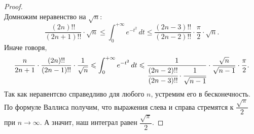 \begin{proof}
\[	\]
	Домножим неравенство на \(\sqrt{n}\): \[
		\frac{(2n)!!}{(2n + 1)!!} \cdot \sqrt{n} \leqslant \int_0^{+\infty} e^{-t^2} \, dt \leqslant \frac{(2n - 3)!!}{(2n - 2)!!} \cdot \frac{\pi}{2} \cdot \sqrt{n}.
	\]
	Иначе говоря, \[
		\frac{n}{2n + 1} \cdot \frac{(2n)!!}{(2n - 1)!!} \cdot \frac{1}{\sqrt{n}} \leqslant \int_0^{+\infty} e^{-t^2} \, dt \leqslant \frac{1}{\cfrac{(2n - 2)!!}{(2n - 3)!!} \cdot \cfrac{1}{\sqrt{n - 1}}} \cdot \frac{\sqrt{n}}{\sqrt{n - 1}}\cdot \frac{\pi}{2}.
	\]
	Так как неравентсво справедливо для любого \(n\), устремим его в бесконечность. По \hypertarget{wall}{формуле Валлиса} получим, что выражения слева и справа стремятся к \(\dfrac{\sqrt{\pi}}{2}\) при \(n \to \infty\). А значит, наш интеграл равен \(\dfrac{\sqrt{\pi}}{2}\).
\end{proof}

